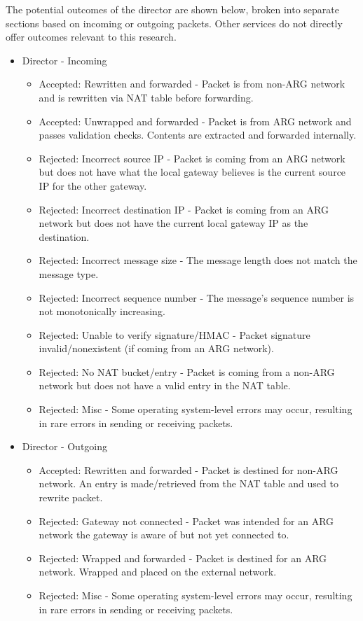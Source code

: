 \par The potential outcomes of the director are shown below, broken into separate sections based on incoming or outgoing packets. Other services do not directly offer outcomes relevant to this research.

\begin{itemize}
\item Director - Incoming
	\begin{itemize}
	\item Accepted: Rewritten and forwarded - Packet is from non-\ac{ARG} network and is rewritten via \ac{NAT} table before forwarding.
	\item Accepted: Unwrapped and forwarded - Packet is from \ac{ARG} network and passes validation checks. Contents are extracted and forwarded internally.

	\item Rejected: Incorrect source \ac{IP} - Packet is coming from an \ac{ARG} network but does not have what the local gateway believes is the current source IP for the other gateway.
	\item Rejected: Incorrect destination \ac{IP} - Packet is coming from an \ac{ARG} network but does not have the current local gateway \ac{IP} as the destination.
	\item Rejected: Incorrect message size - The message length does not match the message type.
	\item Rejected: Incorrect sequence number - The message's sequence number is not monotonically increasing. 
	\item Rejected: Unable to verify signature/\ac{HMAC} - Packet signature invalid/nonexistent (if coming from an \ac{ARG} network).
	\item Rejected: No \ac{NAT} bucket/entry - Packet is coming from a non-\ac{ARG} network but does not have a valid entry in the \ac{NAT} table.

	\item Rejected: Misc - Some operating system-level errors may occur, resulting in rare errors in sending or receiving packets.
	\end{itemize}

\newpage
\item Director - Outgoing
	\begin{itemize}
	\item Accepted: Rewritten and forwarded - Packet is destined for non-\ac{ARG} network. An entry is made/retrieved from the \ac{NAT} table and used to rewrite packet.

	\item Rejected: Gateway not connected - Packet was intended for an ARG network the gateway is aware of but not yet connected to.
	\item Rejected: Wrapped and forwarded - Packet is destined for an \ac{ARG} network. Wrapped and placed on the external network.

	\item Rejected: Misc - Some operating system-level errors may occur, resulting in rare errors in sending or receiving packets.
	\end{itemize}
\end{itemize}

